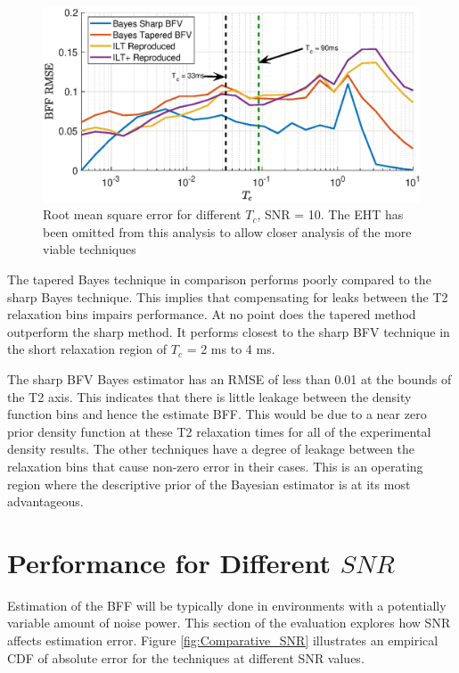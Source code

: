 \begin{figure}[htb!]
    \centering
    \includegraphics[width = \textwidth]{evaluation/different_Tc.eps}
    \caption{Root mean square error for different $T_c$, SNR = 10. The EHT has been omitted from this analysis to allow closer analysis of the more viable techniques}
    \label{fig:TestDifferentTc}
\end{figure}

The tapered Bayes technique in comparison performs poorly compared to the sharp Bayes technique. This implies that compensating for leaks between the T2 relaxation bins impairs performance. At no point does the tapered method outperform the sharp method. It performs closest to the sharp BFV technique in the short relaxation region of $T_c$ = 2 ms to 4 ms.

The sharp BFV Bayes estimator has an RMSE of less than 0.01 at the bounds of the T2 axis. This indicates that there is little leakage between the density function bins and hence the estimate BFF. This would be due to a near zero prior density function at these T2 relaxation times for all of the experimental density results. The other techniques have a degree of leakage between the relaxation bins that cause non-zero error in their cases. This is an operating region where the descriptive prior of the Bayesian estimator is at its most advantageous.




\section{Performance for Different $SNR$} \label{section:differentSNR_evaluation}
Estimation of the BFF will be typically done in environments with a potentially variable amount of noise power. This section of the evaluation explores how SNR affects estimation error. Figure \ref{fig:Comparative_SNR} illustrates an empirical CDF of absolute error for the techniques at different SNR values.  

